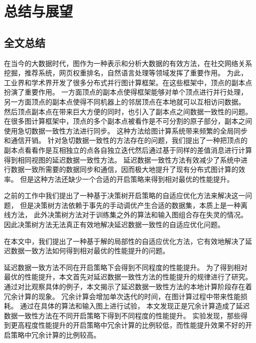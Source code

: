 
\chapter{总结与展望}

\section{全文总结}

在当今的大数据时代，图作为一种表示和分析大数据的有效方法，在社交网络关系挖掘，推荐系统，网页权重排名，自然语言处理等领域发挥了重要作用。
为此，工业界和学术界开发了很多分布式并行图计算框架。在这些框架中，顶点的副本点扮演了重要作用。
一方面顶点的副本点使得框架能够对单个顶点进行并行处理，另一方面顶点的副本点使得不同机器上的邻居顶点在本地就可以互相访问数据。
然后顶点副本点在带来巨大方便的同时，也引入了副本点之间数据一致性的问题。
在很多图计算框架中，顶点的多个副本点被看作是不可分割的原子部分，副本之间使用急切数据一致性方法进行同步。
这种方法给图计算系统带来频繁的全局同步和通信开销。
针对急切数据一致性的方法存在的问题，我们提出了一种把顶点的副本点看看作是互相独立的点各自独立迭代然后通过基于同样的差值消息进行计算得到相同视图的延迟数据一致性方法。
延迟数据一致性方法有效减少了系统中进行数据一致所需要的数据同步和通信，因而极大地提升了现有分布式图计算的效率。
但是这种方法还缺少一个合适的开启策略来得到相对最优的性能提升。

之前的工作中我们提出了一种基于决策树开启策略的自适应优化方法来解决这一问题，
但是决策树方法依赖于事先的手动调优产生合适的数据集，本质上是一种离线方法，
此外决策树方法对于训练集之外的算法和输入图组合存在失灵的情况。
因此决策树方法无法真正有效地解决延迟数据一致性的自适应优化问题。

在本文中，我们提出了一种基于解的局部性的自适应优化方法，它有效地解决了延迟数据一致方法如何得到相对最优的性能提升的问题。


延迟数据一致方法不同在开启策略下会得到不同程度的性能提升。
为了得到相对最优的性能提升，本文首先对延迟数据一致性方法的性能提升的规律进行了研究。
通过对比观察具体的例子，本文揭示了延迟数据一致性方法的本地计算阶段存在着冗余计算的现象。
冗余计算会增加单次迭代的时间，在图计算过程中带来性能损耗。
通过在具体的算法和输入图上进行试验，
本文发现正是冗余计算造成了延迟数据一致性方法在不同开启策略下得到不同程度的性能提升。
实验发现，那些得到更高程度性能提升的开启策略中冗余计算的比例较低，而性能提升效果不好的开启策略中冗余计算的比例较高。

